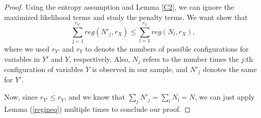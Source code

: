 \begin{proof}
Using the entropy assumption and Lemma \ref{C2}, we can ignore the maximized likelihood terms and study the penalty terms. We want show that
\begin{equation}\label{fnmlPenalty}
\sum_{j = 1}^{r_{Y'}} reg(N'_j,r_X) \leq \sum_{l = 1}^{r_{Y}} reg(N_l,r_X),
\end{equation}where we used $r_{Y'}$ and $r_Y$ to denote the numbers of possible configurations for variables in $Y'$ and $Y$, respectively. Also, $N_j$ refers to the number times the $j$:th configuration of variables $Y$ is observed in our sample, and $N'_j$ denotes the same for $Y'$. 

Now, since $r_{Y'} \leq r_Y$, and we know that $\sum_j N'_j = \sum_l N_l = N$, we can just apply Lemma (\ref{regineq}) multiple times to conclude our proof. 
\end{proof}


